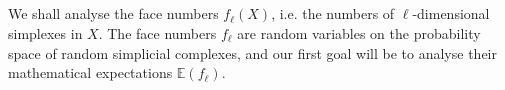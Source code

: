 \documentclass[10pt,a4paper]{amsart}
\newtheorem{teo}[lema]{Theorem}
\newcommand{\N}{\mathbb{N}}
\newcommand{\E}{\mathbb{E}}
\newcommand{\tc}{{\sf{TC}}}
\begin{document}
\subsection{} We shall 
analyse the face numbers $f_\ell(X)$, i.e. the numbers of $\ell$-dimensional simplexes in $X$. The face numbers $f_\ell$ are random variables on the probability space of random simplicial complexes, and our first goal will be to analyse their mathematical expectations $\E(f_\ell)$.


%
%
%
%
%
\end{document}
